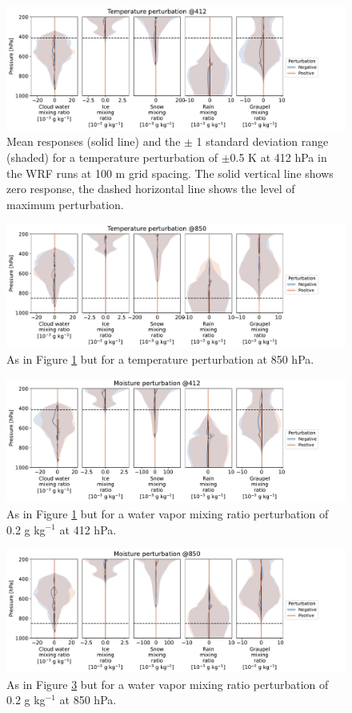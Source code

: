 \documentclass[draft]{agujournal2019}
\begin{document}
\begin{figure}[pth]
    \noindent\includegraphics[width=\textwidth]{figures/pert_var_T_0.5_@412}
    \caption{Mean responses (solid line) and the $\pm$ 1 standard deviation
    range (shaded) for a temperature perturbation of $\pm$0.5 K at 412 hPa in
    the WRF runs at 100 m grid spacing. The solid vertical line shows zero
    response, the dashed horizontal line shows the level of maximum
    perturbation.}
    \label{fig:var_T_412}
\end{figure}

\begin{figure}[pth]
    \noindent\includegraphics[width=\textwidth]{figures/pert_var_T_0.5_@850}
    \caption{As in Figure \ref{fig:var_T_412} but for a temperature perturbation
    at 850 hPa.}
    \label{fig:var_T_850}
\end{figure}

\begin{figure}[pth]
    \noindent\includegraphics[width=\textwidth]{figures/pert_var_q_0.0002_@412}
    \caption{As in Figure \ref{fig:var_T_412} but for a water vapor mixing ratio
    perturbation of 0.2 g kg$^{-1}$ at 412 hPa.}
    \label{fig:var_q_412}
\end{figure}

\begin{figure}[pth]
    \noindent\includegraphics[width=\textwidth]{figures/pert_var_q_0.0002_@850}
    \caption{As in Figure \ref{fig:var_q_412} but for a water vapor mixing ratio
    perturbation of 0.2 g kg$^{-1}$ at 850 hPa.}
    \label{fig:var_q_850}
\end{figure}
\end{document}
